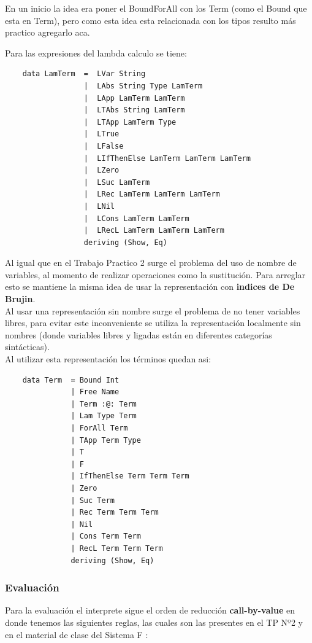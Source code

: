 \documentclass[12pt, titlepage, a4paper]{article}
\begin{document}
En un inicio la idea era poner el BoundForAll con los Term (como el Bound que esta en Term), pero como esta idea esta relacionada con 
los tipos resulto más practico agregarlo aca.

\noindent Para las expresiones del lambda calculo se tiene:
\begin{verbatim}
    data LamTerm  =  LVar String
                  |  LAbs String Type LamTerm
                  |  LApp LamTerm LamTerm
                  |  LTAbs String LamTerm
                  |  LTApp LamTerm Type
                  |  LTrue 
                  |  LFalse
                  |  LIfThenElse LamTerm LamTerm LamTerm
                  |  LZero
                  |  LSuc LamTerm
                  |  LRec LamTerm LamTerm LamTerm
                  |  LNil
                  |  LCons LamTerm LamTerm
                  |  LRecL LamTerm LamTerm LamTerm
                  deriving (Show, Eq)
\end{verbatim}

Al igual que en el Trabajo Practico 2 \cite{tp2:lambdaCalculoSimpleTipado} surge el problema del uso de nombre de variables, al 
momento de realizar operaciones como la sustitución. Para arreglar esto se mantiene la misma idea de 
usar la representación con \textbf{indices de De Brujin}. \\

Al usar una representación sin nombre surge el problema de no tener variables libres,  
para evitar este inconveniente se utiliza la representación localmente sin nombres (donde variables libres y ligadas están 
en diferentes categorías sintácticas). \\

\noindent Al utilizar esta representación los términos quedan asi:
\begin{verbatim}
    data Term  = Bound Int
               | Free Name 
               | Term :@: Term
               | Lam Type Term
               | ForAll Term
               | TApp Term Type
               | T
               | F
               | IfThenElse Term Term Term
               | Zero
               | Suc Term
               | Rec Term Term Term
               | Nil
               | Cons Term Term
               | RecL Term Term Term
               deriving (Show, Eq)
\end{verbatim}

\subsubsection{Evaluación}
Para la evaluación el interprete sigue el orden de reducción \textbf{call-by-value} en donde tenemos las siguientes reglas, las cuales 
son las presentes en el TP Nº2 \cite{tp2:lambdaCalculoSimpleTipado} y en el material de clase del Sistema F \cite{ALP:Polimorfismo}:
\end{document}
